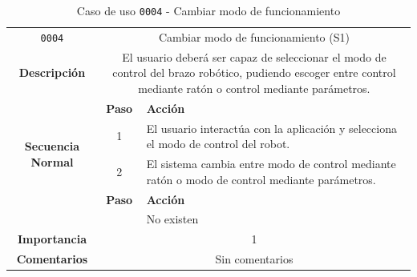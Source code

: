 \begin{table}[H]
    \centering
    \begin{tabularx}{\textwidth}{|c|c|X|}
        \cline{1-3}
        \texttt{0004}                              & \multicolumn{2}{c|}{Cambiar modo de funcionamiento (\ac{S1})}                                                                                                                      \\ \cline{1-3}
        \textbf{Descripción}                       & \multicolumn{2}{m{13cm}|}{El usuario deberá ser capaz de seleccionar el modo de control del brazo robótico, pudiendo escoger entre control mediante ratón o control mediante parámetros. }
        \\ \cline{1-3}
        \multirow{4}{*}{\textbf{Secuencia Normal}} & \textbf{Paso}                                                                                                                                        & \textbf{Acción}
        \\ \cline{2-3}                    &   1  & El usuario interactúa con la aplicación y selecciona el modo de control del robot.
        \\ \cline{2-3}                    &   2  & El sistema cambia entre modo de control mediante ratón o modo de control mediante parámetros.
        \\ \cline{1-3}
        \multirow{2}{*}{\textbf{Excepciones}}      & \textbf{Paso}                                                                                                                                        & \textbf{Acción}
        \\ \cline{2-3}                    &     &  No existen
        \\ \cline{1-3}
        \textbf{Importancia}                       & \multicolumn{2}{c|}{1}                                                                                                                                                 \\ \cline{1-3}
        \textbf{Comentarios}                       & \multicolumn{2}{c|}{Sin comentarios}                                                                                                                                   \\ \cline{1-3}
    \end{tabularx}
    \caption{Caso de uso \texttt{0004} - Cambiar modo de funcionamiento}
    \label{tab:CU0004}
    \label{tab:caso_de_uso_cambiar_modo_de_funcionamiento}
\end{table}


